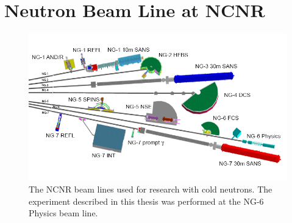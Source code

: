 \documentclass[oneside,12pt]{memoir}
\begin{document}
\section{Neutron Beam Line at NCNR}
\label{sec:ncnr}
\begin{figure}[b]
	\includegraphics[width=\linewidth]{ncnr.png}
	\caption[The NCNR beam lines.]{The NCNR beam lines used for research with cold neutrons. The experiment described in this thesis was performed at the NG-6 Physics beam line.}
	\label{fig:ncnr}
\end{figure}
\end{document}
